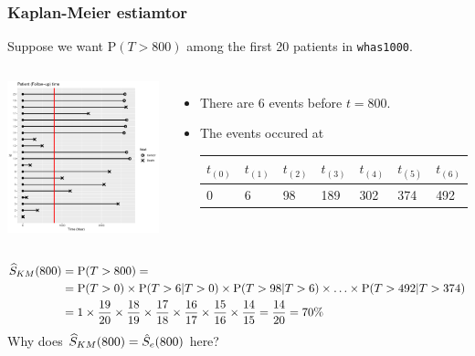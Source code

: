 \documentclass[10pt]{beamer}\usepackage[]{graphicx}\usepackage[]{color}
\newcommand{\p}{\mathrm{P}}
\newcommand{\Skm}{\widehat{S}_{\scriptsize{KM}}}
\begin{document}
\begin{frame}
  \frametitle{Kaplan-Meier estiamtor}
  Suppose we want $\p(T > 800)$ among the first 20 patients in \texttt{whas1000}.
  \begin{columns}
    \includegraphics[scale = .3]{tab1-1-4}
    \begin{itemize}
    \item There are 6 events before $t = 800$.
    \item The events occured at 
      {\scriptsize
      \begin{tabular}{lllllll}
        $t_{(0)}$ & $t_{(1)}$ & $t_{(2)}$ & $t_{(3)}$ & $t_{(4)}$ & $t_{(5)}$ & $t_{(6)}$ \\
        \midrule
        0 & 6 & 98 & 189 & 302 & 374 & 492 \\
      \end{tabular}}
    \end{itemize}
  \end{columns}
  \vspace{-.3cm}
  {\scriptsize
  \begin{align*}
    \Skm(800) &= \p(T > 800) =\\
    &= \p(T > 0) \times \p(T > 6|T > 0) \times \p(T > 98|T > 6) \times
    \ldots\times \p(T > 492|T > 374) \\
    &=1 \times \frac{19}{20} \times \frac{18}{19} \times \frac{17}{18} \times \frac{16}{17} \times \frac{15}{16} \times 
    \frac{14}{15} = \frac{14}{20} = 70\%
  \end{align*}
  }
  Why does $\Skm(800) = \hat S_e(800)$ here?
\end{frame}
\end{document}
